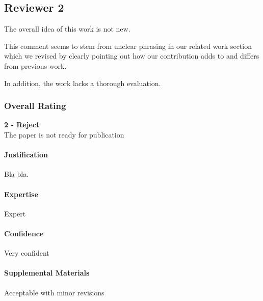 \subsection{Reviewer 2} \label{sec:rev:2}

The overall idea of this work is not new. 

\begin{response} \label{res:rev2:related}
This comment seems to stem from unclear phrasing in our related work section which we revised by clearly pointing out how our contribution adds to and differs from previous work. 
\end{response}

In addition, the work lacks a thorough evaluation.

\subsubsection*{Overall Rating}
\textbf{2 - Reject} \\
The paper is not ready for publication

\paragraph{Justification}
Bla bla.

\paragraph{Expertise}
Expert

\paragraph{Confidence}
Very confident

\paragraph{Supplemental Materials}
Acceptable with minor revisions
